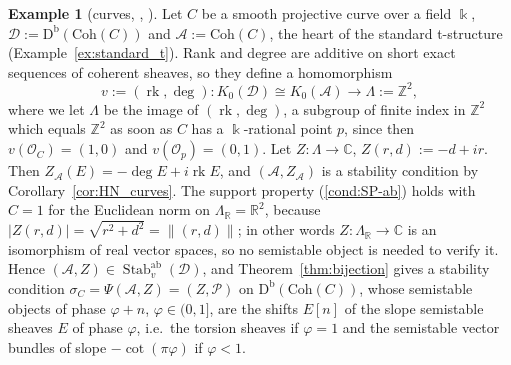 \documentclass[12pt]{amsart}
\newcommand{\condref}[1]{\textup{(\ref{#1})}}
\numberwithin{theorem}{section}
\theoremstyle{definition}
\newtheorem{example}[theorem]{Example}
\newcommand{\D}{\mathrm{D}}
\newcommand{\CC}{\mathbb{C}}
\newcommand{\RR}{\mathbb{R}}
\newcommand{\ZZ}{\mathbb{Z}}
\newcommand{\calA}{\mathcal{A}}
\newcommand{\calP}{\mathcal{P}}
\newcommand{\kk}{\Bbbk}
\newcommand{\oo}{\mathscr{O}}
\newcommand{\Kgroup}{K_0}
\newcommand{\calD}{\mathcal{D}}
\begin{document}
	\begin{example}[curves, {\cite[Example~5.4]{Bri07}}, {\cite[Example~5.12]{MS17}}]
		\label{ex:curves_bridgeland}
		Let $C$ be a smooth projective curve over a field $\kk$, $\calD := \D^{\mathrm{b}}(\mathrm{Coh}(C))$ and $\calA := \mathrm{Coh}(C)$, the heart of the standard t-structure (Example~\ref{ex:standard_t}).
		Rank and degree are additive on short exact sequences of coherent sheaves, so they define a homomorphism
		\[
		v := (\operatorname{rk}, \deg) \colon \Kgroup(\calD) \cong \Kgroup(\calA) \longrightarrow \Lambda := \ZZ^2 ,
		\]
		where we let $\Lambda$ be the image of $(\operatorname{rk}, \deg)$, a subgroup of finite index in $\ZZ^2$ which equals $\ZZ^2$ as soon as $C$ has a $\kk$-rational point $p$, since then $v(\oo_C) = (1, 0)$ and $v(\oo_p) = (0, 1)$.
		Let $Z \colon \Lambda \to \CC$, $Z(r, d) := -d + i r$.
		Then $Z_{\calA}(E) = -\deg E + i \operatorname{rk} E$, and $(\calA, Z_{\calA})$ is a stability condition by Corollary~\ref{cor:HN_curves}.
		The support property \condref{cond:SP-ab} holds with $C = 1$ for the Euclidean norm on $\Lambda_{\RR} = \RR^2$, because $|Z(r, d)| = \sqrt{r^2 + d^2} = \| (r, d) \|$;
		in other words $Z \colon \Lambda_{\RR} \to \CC$ is an isomorphism of real vector spaces, so no semistable object is needed to verify it.
		Hence $(\calA, Z) \in \operatorname{Stab}^{\mathrm{ab}}_v(\calD)$, and Theorem~\ref{thm:bijection} gives a stability condition $\sigma_C = \Psi(\calA, Z) = (Z, \calP)$ on $\D^{\mathrm{b}}(\mathrm{Coh}(C))$, whose semistable objects of phase $\varphi + n$, $\varphi \in (0, 1]$, are the shifts $E[n]$ of the slope semistable sheaves $E$ of phase $\varphi$, i.e.\ the torsion sheaves if $\varphi = 1$ and the semistable vector bundles of slope $-\cot(\pi \varphi)$ if $\varphi < 1$.
	\end{example}
\end{document}
